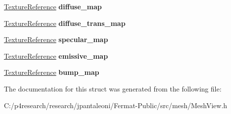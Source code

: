 \begin{DoxyCompactItemize}
\hyperlink{struct_texture_reference}{Texture\+Reference} {\bfseries diffuse\+\_\+map}
\item 
\mbox{\label{struct_mesh_material_aba36269a719447d03312de491d68b38b}} 
\hyperlink{struct_texture_reference}{Texture\+Reference} {\bfseries diffuse\+\_\+trans\+\_\+map}
\item 
\mbox{\label{struct_mesh_material_a5771fdaee02c98f5a17d49e056c31ce6}} 
\hyperlink{struct_texture_reference}{Texture\+Reference} {\bfseries specular\+\_\+map}
\item 
\mbox{\label{struct_mesh_material_ae0661b4a8d23ced275218f2cb3bdbd99}} 
\hyperlink{struct_texture_reference}{Texture\+Reference} {\bfseries emissive\+\_\+map}
\item 
\mbox{\label{struct_mesh_material_a9031903fa8c442293fd68210201a9621}} 
\hyperlink{struct_texture_reference}{Texture\+Reference} {\bfseries bump\+\_\+map}
\end{DoxyCompactItemize}


The documentation for this struct was generated from the following file\+:\begin{DoxyCompactItemize}
\item 
C\+:/p4research/research/jpantaleoni/\+Fermat-\/\+Public/src/mesh/Mesh\+View.\+h\end{DoxyCompactItemize}
